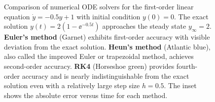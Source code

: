 \begin{figure}[htbp]
\begin{tikzpicture}
\end{tikzpicture}
\caption{Comparison of numerical ODE solvers for the first-order linear equation $\dot{y} = -0.5y + 1$ with initial condition $y(0) = 0$. The exact solution $y(t) = 2(1 - \ee^{-0.5t})$ approaches the steady state $y_\infty = 2$. \textbf{Euler's method} (Garnet) exhibits first-order accuracy with visible deviation from the exact solution. \textbf{Heun's method} (Atlantic blue), also called the improved Euler or trapezoidal method, achieves second-order accuracy. \textbf{RK4} (Horseshoe green) provides fourth-order accuracy and is nearly indistinguishable from the exact solution even with a relatively large step size $h = 0.5$. The inset shows the absolute error versus time for each method.}
\label{fig:ode_solver_comparison}
\end{figure}
